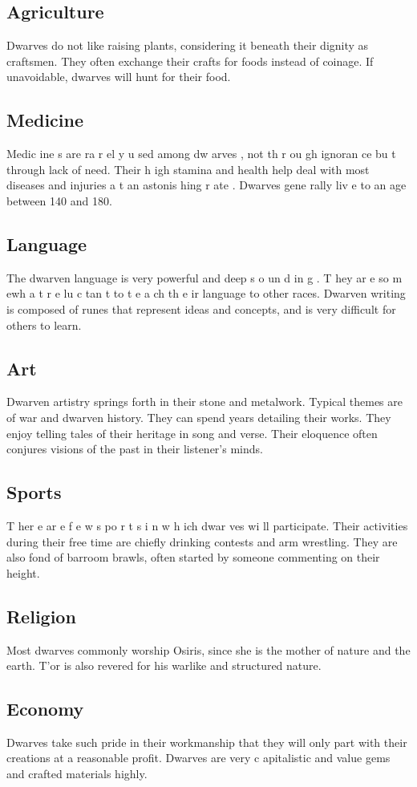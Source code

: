 \begin{multicols*}{2}
\subsection{Agriculture}
Dwarves do not like raising plants, considering it
beneath their dignity as craftsmen. They often exchange their
crafts for foods instead of coinage. If unavoidable, dwarves
will hunt for their food.
\subsection{Medicine}
Medic ine s are ra r el y u sed among dw arves , not
th r ou gh ignoran ce bu t through lack of need. Their h igh
stamina and health help deal with most diseases and injuries
a t an astonis hing r ate . Dwarves gene rally liv e to an age
between 140 and 180.
\subsection{Language}
The dwarven language is very powerful and deep
s o un d in g . T hey ar e so m ewh a t r e lu c tan t to t e a ch th e ir
language to other races. Dwarven writing is composed of
runes that represent ideas and concepts, and is very difficult
for others to learn.
\subsection{Art}
Dwarven artistry springs forth in their stone and
metalwork. Typical themes are of war and dwarven history.
They can spend years detailing their works.
They enjoy telling tales of their heritage in song
and verse. Their eloquence often conjures visions of the past
in their listener’s minds.
\subsection{Sports}
T her e ar e f e w s po r t s i n w h ich dwar ves wi ll
participate. Their activities during their free time are chiefly
drinking contests and arm wrestling. They are also fond of
barroom brawls, often started by someone commenting on
their height.
\subsection{Religion}
Most dwarves commonly worship Osiris, since she
is the mother of nature and the earth. T’or is also revered for
his warlike and structured nature.
\subsection{Economy}
Dwarves take such pride in their workmanship that
they will only part with their creations at a reasonable profit.
Dwarves are very c apitalistic and value gems and crafted
materials highly.

\end{multicols*}
